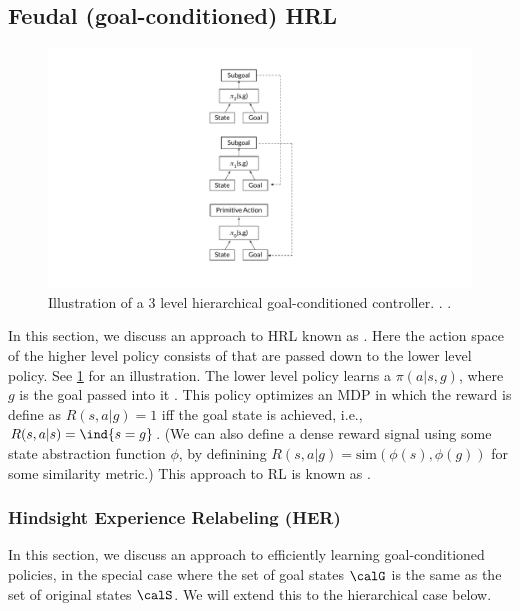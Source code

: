 \subsection{Feudal (goal-conditioned) HRL}
\label{sec:feudal}
\label{sec:GCRL}

\begin{figure}
\centering
\includegraphics[height=2.5in]{figs/Goal_Cond_HRL_Architecture.pdf}
\caption{
  Illustration of a 3 level hierarchical goal-conditioned controller.
.
.
}
\label{fig:HAC}
\end{figure}

In this section, we discuss an approach to HRL known as
 \citep{Dayan1992}. Here the action
space of the higher level policy consists of 
that are passed down to the lower level policy.
See \cref{fig:HAC} for an illustration.
The lower level policy learns a 
$\pi(a|s,g)$, where $g$ is the goal passed into it
\citep{Schaul2015}.
This policy
optimizes an MDP in which the reward is define as $R(s,a|g)=1$
iff the goal state is achieved,
i.e., $R(s,a|s) = \ind{s=g}$.
(We can also define a dense reward signal using
some state abstraction function $\phi$,
by definining $R(s,a|g)=\text{sim}(\phi(s), \phi(g))$
for some similarity metric.)
This approach to RL is known as
 \citep{Liu2022GCL}.


\subsubsection{Hindsight Experience Relabeling (HER)}
\label{sec:HER}


In this section, we discuss an approach to efficiently learning
goal-conditioned  policies,
in the special case where
the set of goal states
$\calG$ is the same as the set of original states $\calS$.
We will extend this to the hierarchical case below.

